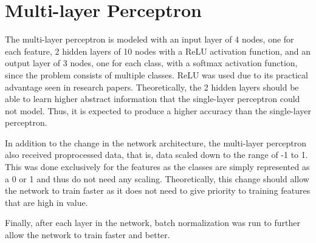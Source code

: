 \documentclass[12pt]{article}
\begin{document}
\section{Multi-layer Perceptron }
The multi-layer perceptron is modeled with an input               
layer of 4 nodes, one for each feature, 2 hidden                   
layers of 10 nodes with a ReLU activation function,                 
and an output layer of 3 nodes, one for each class,                     
with a softmax activation function, since the             
problem consists of multiple classes. ReLU was             
used due to its practical advantage seen in research                 
papers. Theoretically, the 2 hidden layers should be               
able to learn higher abstract information that the               
single-layer perceptron could not model. Thus, it is               
expected to produce a higher accuracy than the               
single-layer perceptron.
\par
In addition to the change in the network               
architecture, the multi-layer perceptron also         
received proprocessed data, that is, data scaled             
down to the range of -1 to 1. This was done                     
exclusively for the features as the classes are simply                 
represented as a 0 or 1 and thus do not need any                       
scaling. Theoretically, this change should allow the             
network to train faster as it does not need to give                     
priority to training features that are high in value.
\par
Finally, after each layer in the network,             
batch normalization was run to further allow the               
network to train faster and better.
\end{document}
